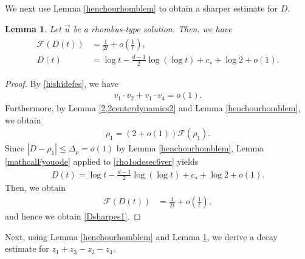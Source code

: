 \documentclass[10pt,a4paper]{amsart}
\newtheorem{lemma}[theorem]{Lemma}
\numberwithin{equation}{section}
\begin{document}
We next use Lemma \ref{henchourhomblem} to obtain a sharper estimate for $D$.

\begin{lemma}\label{Dsharprhomblem}
Let $\vec{u}$ be a rhombus-type solution. Then, we have
\begin{align}\label{Dsharpes1}
\begin{aligned}
\mathcal{F}(D(t))&=\frac{1}{2t}+o\left(\frac{1}{t}\right),
\\
D(t)&=\log{t}-\frac{d-1}{2}\log{(\log{t})}+c_{\star}+\log{2}+o(1).
\end{aligned}
\end{align}
\end{lemma}
\begin{proof}
By \eqref{hishidefes}, we have
\begin{align*}
v_1\cdot v_2+v_1\cdot v_4=o(1).
\end{align*}
Furthermore, by Lemma \ref{2,2centerdynamics2} and Lemma \ref{henchourhomblem}, we obtain
\begin{align}\label{rho1odesec6ver}
\dot{\rho}_1=\left(2+o(1)\right)\mathcal{F}(\rho_1).
\end{align}
Since $|D-\rho_1|\leq\Delta_\rho=o(1)$ by Lemma \ref{henchourhomblem}, Lemma \ref{mathcalFyouode} applied to \eqref{rho1odesec6ver} yields
\begin{align*}
D(t)=\log{t}-\frac{d-1}{2}\log{(\log{t})}+c_{\star}+\log{2}+o(1).
\end{align*}
Then, we obtain 
\begin{align*}
\mathcal{F}(D(t))&=\frac{1}{2t}+o\left(\frac{1}{t}\right),
\end{align*}
and hence we obtain \eqref{Dsharpes1}.
\end{proof}

Next, using Lemma \ref{henchourhomblem} and Lemma \ref{Dsharprhomblem}, we derive a decay estimate for $z_1+z_3-z_2-z_4$.
\end{document}
